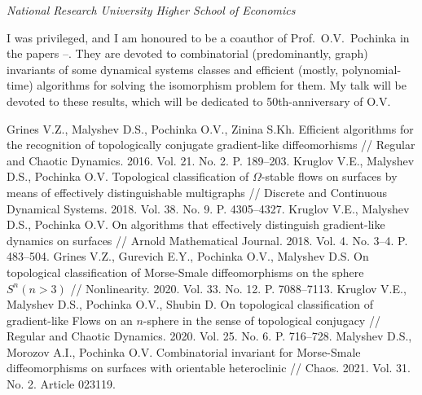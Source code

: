 

\begin{center}
	\maketitle
	{\large\textit{National Research University Higher School of Economics}}
\end{center}

I was privileged, and I am honoured to be a coauthor of \mbox{Prof. O.V. Pochinka} in the papers \cite{GMPZ16}--\cite{MMP21}.
They are devoted to combinatorial (predominantly, graph) invariants of some dynamical systems classes and efficient (mostly, polynomial-time) 
algorithms for solving the isomorphism problem for them. My talk will be devoted to these results, which will be dedicated to 50th-anniversary
of O.V. 


\begin{thebibliography}{99}
 Grines V.Z., Malyshev D.S., Pochinka O.V., Zinina S.Kh. Efficient algorithms for the recognition of topologically conjugate gradient-like diffeomorhisms // Regular and Chaotic Dynamics. 2016. Vol. 21. No. 2. P. 189--203.
 Kruglov V.E., Malyshev D.S., Pochinka O.V. Topological classification of $\Omega$-stable flows on surfaces by means of effectively distinguishable multigraphs // Discrete and Continuous Dynamical Systems. 2018. Vol. 38. No. 9. P. 4305--4327.
 Kruglov V.E., Malyshev D.S., Pochinka O.V. On algorithms that effectively distinguish gradient-like dynamics on surfaces // Arnold Mathematical Journal. 2018. Vol. 4. No. 3--4. P. 483--504.
 Grines V.Z., Gurevich E.Y., Pochinka O.V., Malyshev D.S. On topological classification of Morse-Smale diffeomorphisms on the sphere $S^n(n>3)$ // Nonlinearity. 2020. Vol. 33. No. 12. P. 7088--7113.
 Kruglov V.E., Malyshev D.S., Pochinka O.V., Shubin D. On topological classification of gradient-like Flows on an $n$-sphere in the sense of topological conjugacy // Regular and Chaotic Dynamics. 2020. Vol. 25. No. 6. P. 716--728.
 Malyshev D.S., Morozov A.I., Pochinka O.V. Combinatorial invariant for Morse-Smale diffeomorphisms on surfaces with orientable heteroclinic // Chaos. 2021. Vol. 31. No. 2. Article 023119.
\end{thebibliography}

